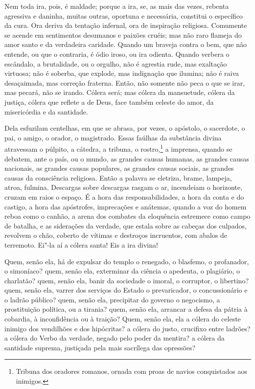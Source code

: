 Nem toda ira, pois, é maldade; porque a ira, se, as mais das
vezes, rebenta agressiva e daninha, muitas outras, oportuna e
necessária, constitui o específico da cura. Ora deriva da tentação
infernal, ora de inspiração religiosa. Comumente se acende em
sentimentos desumanos e paixões cruéis; mas não raro flameja do amor
santo e da verdadeira caridade. Quando um braveja contra o bem, que não
entende, ou que o contraria, é ódio iroso, ou ira odienta. Quando
verbera o escândalo, a brutalidade, ou o orgulho, não é agrestia rude,
mas exaltação virtuosa; não é soberba, que explode, mas indignação que
ilumina; não é raiva desaçaimada, mas correção fraterna. Então, não
somente não peca o que se irar, mas pecará, não se irando. Cólera será;
mas cólera da mansuetude, cólera da justiça, cólera que reflete a de
Deus, face também celeste do amor, da misericórdia e da santidade.

Dela esfuzilam centelhas, em que se abrasa, por vezes, o apóstolo,
o sacerdote, o pai, o amigo, o orador, o magistrado. Essas faúlhas da
substância divina atravessam o púlpito, a cátedra, a tribuna, o
rostro,\footnote{ Tribuna dos oradores romanos, ornada com proas de
navios conquistados aos inimigos.} a imprensa, quando se debatem, ante
o país, ou o mundo, as grandes causas humanas, as grandes causas
nacionais, as grandes causas populares, as grandes causas sociais, as
grandes causas da consciência religiosa. Então a palavra se eletriza,
brame, lampeja, atroa, fulmina. Descargas sobre descargas rasgam o ar,
incendeiam o horizonte, cruzam em raios o espaço. É a hora das
responsabilidades, a hora da conta e do castigo, a hora das apóstrofes,
imprecações e anátemas, quando a voz do homem reboa como o canhão, a
arena dos combates da eloquência estremece como campo de batalha, e as
siderações da verdade, que estala sobre as cabeças dos culpados,
revolvem o chão, coberto de vítimas e destroços incruentos, com abalos
de terremoto. Ei"-la aí a cólera santa! Eis a ira divina!

Quem, senão ela, há de expulsar do templo o renegado, o blasfemo,
o profanador, o simoníaco? quem, senão ela, exterminar da ciência o
apedeuta, o plagiário, o charlatão? quem, senão ela, banir da sociedade
o imoral, o corruptor, o libertino? quem, senão ela, varrer dos
serviços do Estado o prevaricador, o concussionário e o ladrão público?
quem, senão ela, precipitar do governo o negocismo, a prostituição
política, ou a tirania? quem, senão ela, arrancar a defesa da pátria à
cobardia, à inconfidência ou à traição? Quem, senão ela, ela a cólera
do celeste inimigo dos vendilhões e dos hipócritas? a cólera do justo,
crucifixo entre ladrões? a cólera do Verbo da verdade, negado pelo
poder da mentira? a cólera da santidade suprema, justiçada pela mais
sacrílega das opressões?

